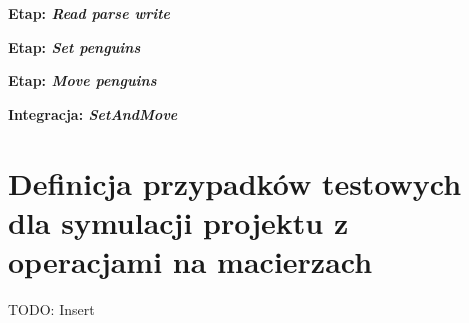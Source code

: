 {
\setlength\parindent{0pt}

\large
\textbf{Etap: \textit{Read parse write}}
\normalsize



\large
\textbf{Etap: \textit{Set penguins}}
\normalsize



\large
\textbf{Etap: \textit{Move penguins}}
\normalsize



\large
\textbf{Integracja: \textit{SetAndMove}}
\normalsize


}

\section*{Definicja przypadków testowych dla symulacji projektu z operacjami na macierzach}
\label{file:test_cases_matrix}

{
TODO: Insert
}


\clearpage

